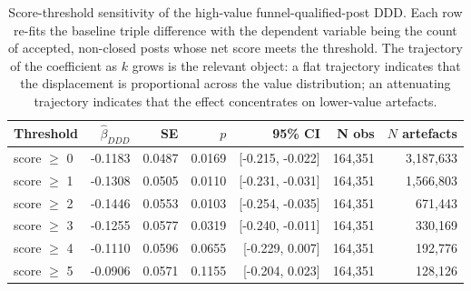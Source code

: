 \begin{table}[ht]
\centering
\caption{Score-threshold sensitivity of the high-value funnel-qualified-post DDD. Each row re-fits the baseline triple difference with the dependent variable being the count of accepted, non-closed posts whose net score meets the threshold. The trajectory of the coefficient as $k$ grows is the relevant object: a flat trajectory indicates that the displacement is proportional across the value distribution; an attenuating trajectory indicates that the effect concentrates on lower-value artefacts.}
\label{tab:score_threshold_sensitivity}
\small
\begin{tabular}{lrrrrrr}
\toprule
Threshold & $\hat\beta_{DDD}$ & SE & $p$ & 95\% CI & N obs & $N$ artefacts \\
\midrule
score $\geq$ 0 & -0.1183 & 0.0487 & 0.0169 & [-0.215, -0.022] & 164,351 & 3,187,633 \\
score $\geq$ 1 & -0.1308 & 0.0505 & 0.0110 & [-0.231, -0.031] & 164,351 & 1,566,803 \\
score $\geq$ 2 & -0.1446 & 0.0553 & 0.0103 & [-0.254, -0.035] & 164,351 & 671,443 \\
score $\geq$ 3 & -0.1255 & 0.0577 & 0.0319 & [-0.240, -0.011] & 164,351 & 330,169 \\
score $\geq$ 4 & -0.1110 & 0.0596 & 0.0655 & [-0.229, 0.007] & 164,351 & 192,776 \\
score $\geq$ 5 & -0.0906 & 0.0571 & 0.1155 & [-0.204, 0.023] & 164,351 & 128,126 \\
\bottomrule
\end{tabular}
\end{table}